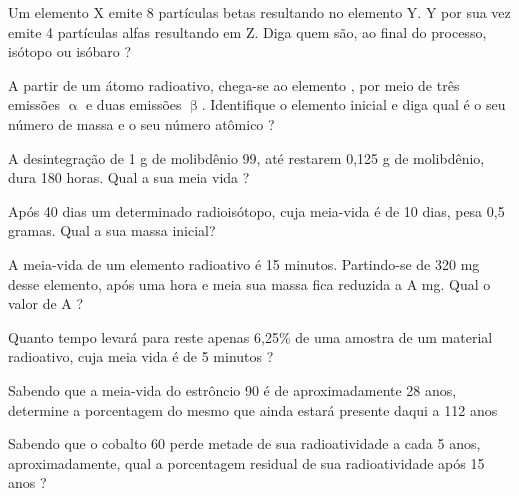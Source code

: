 \documentclass[10pt]{scrartcl}
\begin{document}
\begin{exercise}
Um elemento X emite 8 partículas betas resultando no elemento Y. Y por sua vez emite 4 partículas alfas resultando em Z. Diga quem são, ao final do processo, isótopo ou isóbaro ?
\end{exercise}


\begin{exercise}
A partir de um átomo radioativo, chega-se ao elemento , por meio de três emissões \(\upalpha\) e duas emissões \(\upbeta\). Identifique o elemento inicial e diga qual é o seu número de massa e o seu número atômico ?
\end{exercise}





\begin{exercise}
A desintegração de 1 g de molibdênio 99, até restarem 0,125 g de molibdênio, dura 180 horas. Qual a sua meia vida ?
\end{exercise}



\begin{exercise}
Após 40 dias um determinado radioisótopo, cuja meia-vida é de 10 dias, pesa 0,5 gramas. Qual a sua massa inicial?
\end{exercise}



\begin{exercise}
A meia-vida de um elemento radioativo é 15 minutos. Partindo-se de 320 mg desse elemento, após uma hora e meia sua massa fica reduzida a A mg. Qual o valor de A ?
\end{exercise}


\begin{exercise}
Quanto tempo levará para reste apenas 6,25\% de uma amostra de um material radioativo, cuja meia vida é de 5 minutos ?
\end{exercise}


\begin{exercise}
Sabendo que a meia-vida do estrôncio 90 é de aproximadamente 28 anos, determine a porcentagem do mesmo que ainda estará presente daqui a 112 anos
\end{exercise}



\begin{exercise}
Sabendo que o cobalto 60 perde metade de sua radioatividade a cada 5 anos, aproximadamente, qual a porcentagem residual de sua radioatividade após 15 anos ?
\end{exercise}
\end{document}
